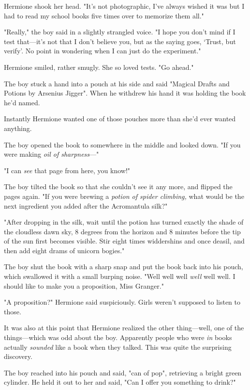 Hermione shook her head. "It's not photographic, I've always wished it was but
I had to read my school books five times over to memorize them all."

"Really," the boy said in a slightly strangled voice. "I hope you don't mind if
I test that—it's not that I don't believe you, but as the saying goes,
`Trust, but verify'. No point in wondering when I can just do the experiment."

Hermione smiled, rather smugly. She so loved tests. "Go ahead."

The boy stuck a hand into a pouch at his side and said "Magical Drafts and
Potions by Arsenius Jigger". When he withdrew his hand it was holding the book
he'd named.

Instantly Hermione wanted one of those pouches more than she'd ever wanted
anything.

The boy opened the book to somewhere in the middle and looked down. "If you
were making \emph{oil of sharpness}—"

"I can \emph{see} that page from here, you know!"

The boy tilted the book so that she couldn't see it any more, and flipped the
pages again. "If you were brewing a \emph{potion of spider climbing,} what
would be the next ingredient you added after the Acromantula silk?"

"After dropping in the silk, wait until the potion has turned exactly the shade
of the cloudless dawn sky, 8 degrees from the horizon and 8 minutes before the
tip of the sun first becomes visible. Stir eight times widdershins and once
deasil, and then add eight drams of unicorn bogies."

The boy shut the book with a sharp snap and put the book back into his pouch,
which swallowed it with a small burping noise. "Well well well \emph{well} well
well. I should like to make you a proposition, Miss Granger."

"A proposition?" Hermione said suspiciously. Girls weren't supposed to listen
to those.

It was also at this point that Hermione realized the other thing—well, one of
the things—which was odd about the boy. Apparently people who were \emph{in}
books actually \emph{sounded} like a book when they talked. This was quite the
surprising discovery.

The boy reached into his pouch and said, "can of pop", retrieving a bright
green cylinder. He held it out to her and said, "Can I offer you something to
drink?"

